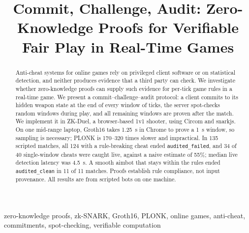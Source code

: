 \documentclass[conference]{IEEEtran}
\newcommand{\status}[1]{\texttt{#1}}
\begin{document}
\title{Commit, Challenge, Audit: Zero-Knowledge Proofs for Verifiable Fair Play in Real-Time Games}

\author{
\and
{}
}

\maketitle

\begin{abstract}
Anti-cheat systems for online games rely on privileged client software or on statistical detection, and neither produces evidence that a third party can check.
We investigate whether zero-knowledge proofs can supply such evidence for per-tick game rules in a real-time game.
We present a commit--challenge--audit protocol: a client commits to its hidden weapon state at the end of every window of ticks, the server spot-checks random windows during play, and all remaining windows are proven after the match.
We implement it in ZK-Duel, a browser-based 1v1 shooter, using Circom and snarkjs.
On one mid-range laptop, Groth16 takes 1.25~s in Chrome to prove a 1~s window, so sampling is necessary; %
PLONK is 170--320 times slower and impractical. %
In 135 scripted matches, all 124 with a rule-breaking cheat ended \status{audited\_failed}, %
and 34 of 40 single-window cheats were caught live, against a naive estimate of 55\%; %
median live detection latency was 4.5~s. %
A smooth aimbot that stays within the rules ended \status{audited\_clean} in 11 of 11 matches. %
Proofs establish rule compliance, not input provenance.
All results are from scripted bots on one machine.
\end{abstract}

\begin{IEEEkeywords}
zero-knowledge proofs, zk-SNARK, Groth16, PLONK, online games, anti-cheat, commitments, spot-checking, verifiable computation
\end{IEEEkeywords}
\end{document}
